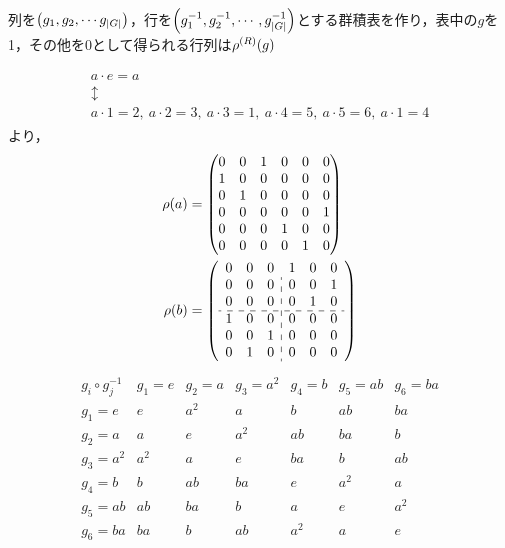 \documentclass[main]{subfiles}
\begin{document}
		\begin{remark*}
			列を$\qty(g_1,g_2,\cdots g_\qty|G|)$，行を$\qty(g_1^{-1},g_2^{-1},\cdots,g_\qty|G|^{-1})$とする群積表を作り，表中の$g$を1，その他を0として得られる行列は$\rho^\qty(R)\qty(g)$
		\end{remark*}
		\begin{ex}
			\begin{align*}
				\begin{array}{l}
					a\cdot e=a   \\
					\updownarrow \\
					a\cdot 1=2,\ a\cdot 2=3,\ a\cdot 3=1,\ a\cdot 4=5,\ a\cdot 5=6,\ a\cdot 1=4
				\end{array}
			\end{align*}
			より，
			\begin{align*}
				\rho\qty(a) & =\mqty(0                            & 0 & 1 & 0 & 0 & 0 \\1&0&0&0&0&0\\0&1&0&0&0&0\\0&0&0&0&0&1\\0&0&0&1&0&0\\0&0&0&0&1&0)\\
				\rho\qty(b) & =\qty(\begin{array}{ccc:ccc}
					                    0 & 0 & 0 & 1 & 0 & 0 \\
					                    0 & 0 & 0 & 0 & 0 & 1 \\
					                    0 & 0 & 0 & 0 & 1 & 0 \\ \hdashline
					                    1 & 0 & 0 & 0 & 0 & 0 \\
					                    0 & 0 & 1 & 0 & 0 & 0 \\
					                    0 & 1 & 0 & 0 & 0 & 0
				                    \end{array})
			\end{align*}
			\begin{align*}
				\begin{array}{c|cccccc}
					g_i\circ g_j^{-1} & g_1=e & g_2=a & g_3=a^2 & g_4=b & g_5=ab & g_6=ba \\\hline
					g_1=e             & e     & a^2   & a       & b     & ab     & ba     \\
					g_2=a             & a     & e     & a^2     & ab    & ba     & b      \\
					g_3=a^2           & a^2   & a     & e       & ba    & b      & ab     \\
					g_4=b             & b     & ab    & ba      & e     & a^2    & a      \\
					g_5=ab            & ab    & ba    & b       & a     & e      & a^2    \\
					g_6=ba            & ba    & b     & ab      & a^2   & a      & e
				\end{array}
			\end{align*}
		\end{ex}
\end{document}
